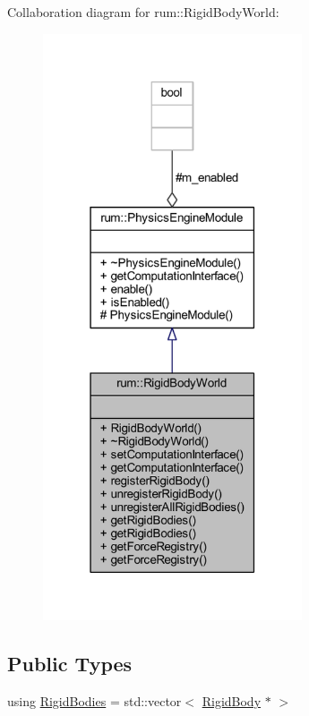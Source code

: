 Collaboration diagram for rum\+:\+:Rigid\+Body\+World\+:\nopagebreak
\begin{figure}[H]
\begin{center}
\leavevmode
\includegraphics[width=217pt]{classrum_1_1_rigid_body_world__coll__graph}
\end{center}
\end{figure}
\subsection*{Public Types}
\begin{DoxyCompactItemize}
\item 
using \mbox{\hyperlink{classrum_1_1_rigid_body_world_a9604007b7513d401a9a92ae5d9be9425}{Rigid\+Bodies}} = std\+::vector$<$ \mbox{\hyperlink{classrum_1_1_rigid_body}{Rigid\+Body}} $\ast$ $>$
\end{DoxyCompactItemize}
